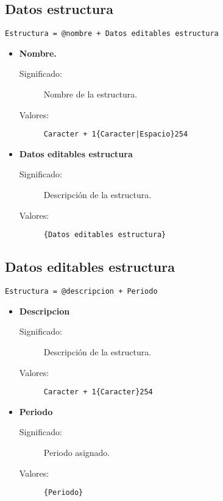 
\subsection{Datos estructura}\label{dd:DatosEstructura}
\begin{lstlisting}
Estructura = @nombre + Datos editables estructura
\end{lstlisting}
	\begin{itemize}
		\item \textbf{Nombre.}\label{NombreEstructura}
			\begin{description}
				\item [Significado:] Nombre de la estructura.
				\item [Valores:]{\begin{lstlisting}
Caracter + 1{Caracter|Espacio}254\end{lstlisting}}
			\end{description}
		\item \textbf{Datos editables estructura}\label{DatosEditablesEstructura}
			\begin{description}
			\item [Significado:] Descripción de la estructura. 
				\item [Valores:]{\begin{lstlisting}
{Datos editables estructura}\end{lstlisting}}
			\end{description}
	\end{itemize}

\subsection{Datos editables estructura}\label{dd:DatosEditablesEstructura}
\begin{lstlisting}
Estructura = @descripcion + Periodo
\end{lstlisting}
	\begin{itemize}
		\item \textbf{Descripcion}\label{Descripcion}
			\begin{description}
			\item [Significado:] Descripción de la estructura. 
				\item [Valores:]{\begin{lstlisting}
Caracter + 1{Caracter}254\end{lstlisting}}
			\end{description}
		\item \textbf{Periodo}\label{Periodo}
			\begin{description}
			\item [Significado:] Periodo asignado. 
				\item [Valores:]{\begin{lstlisting}
{Periodo}\end{lstlisting}}
			\end{description}
	\end{itemize}


